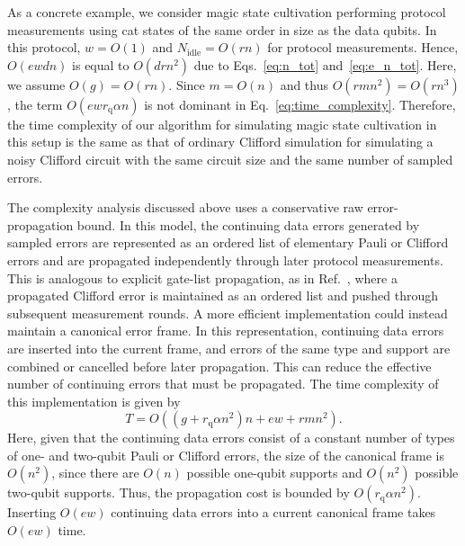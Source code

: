 \documentclass[
 reprint,
 amsmath,amssymb,
 pra,superscriptaddress, nofootinbib
]{revtex4-2}
\theoremstyle{definition}
\theoremstyle{plain}
\begin{document}
As a concrete example, we consider magic state cultivation performing protocol measurements using cat states of the same order in size as the data qubits. In this protocol, $w=O(1)$ and $N_{\mathrm{idle}}=O(rn)$ for protocol measurements. Hence, $O(ewdn)$ is equal to $O(drn^2)$ due to Eqs.~\eqref{eq:n_tot} and~\eqref{eq:e_n_tot}. Here, we assume $O(g)=O(rn)$.
Since $m=O(n)$ and thus $O(rmn^2)=O(rn^3)$, the term $O(ewr_\mathrm{q}\alpha n)$ is not dominant in Eq.~\eqref{eq:time_complexity}.
Therefore, the time complexity of our algorithm for simulating magic state cultivation in this setup is the same as that of ordinary Clifford simulation for simulating a noisy Clifford circuit with the same circuit size and the same number of sampled errors. 

The complexity analysis discussed above uses a conservative raw error-propagation bound. In this model, the continuing data errors generated by sampled errors are represented as an ordered list of elementary Pauli or Clifford errors and are propagated independently through later protocol measurements. This is
analogous to explicit gate-list propagation, as in Ref.~\cite{fby6-xjbm}, where a propagated Clifford error is maintained as an ordered list and pushed through subsequent measurement rounds.
A more efficient implementation could instead maintain a canonical error frame. In this representation, continuing data errors are inserted into the current frame, and errors of the same type and support are combined or cancelled before later propagation. This can reduce the effective number of continuing errors that must be propagated. The time complexity of this implementation is given by
\begin{equation}
    T=O\!\left((g+r_\mathrm{q}\alpha n^2)n+ew+rmn^2\right).
    \label{eq:time_complexity_canonical}
\end{equation}
Here, given that the continuing data errors consist of a constant number of types of one- and two-qubit Pauli or Clifford errors, the size of the canonical frame is $O(n^2)$, since there are $O(n)$ possible one-qubit supports and $O(n^2)$ possible two-qubit supports.
Thus, the propagation cost is bounded by $O(r_\mathrm{q}\alpha n^2)$.
Inserting $O(ew)$ continuing data errors into a current canonical frame takes $O(ew)$ time.
\end{document}
